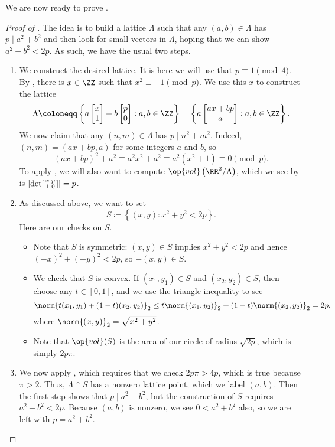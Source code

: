 \documentclass[../notes.tex]{subfiles}
\begin{document}
We are now ready to prove .
\begin{proof}[Proof of ]
	The idea is to build a lattice $\Lambda$ such that any $(a,b)\in\Lambda$ has $p\mid a^2+b^2$ and then look for small vectors in $\Lambda$, hoping that we can show $a^2+b^2<2p$. As such, we have the usual two steps.
	\begin{enumerate}
		\item We construct the desired lattice. It is here we will use that $p\equiv1\pmod4$. By , there is $x\in\ZZ$ such that $x^2\equiv-1\pmod p$. We use this $x$ to construct the lattice
		\[\Lambda\coloneqq\left\{a\begin{bmatrix}
			x \\ 1
		\end{bmatrix}+b\begin{bmatrix}
			p \\ 0
		\end{bmatrix}:a,b\in\ZZ\right\}=\left\{a\begin{bmatrix}
			ax+bp \\ a
		\end{bmatrix}:a,b\in\ZZ\right\}.\]
		We now claim that any $(n,m)\in\Lambda$ has $p\mid n^2+m^2$. Indeed, $(n,m)=(ax+bp,a)$ for some integers $a$ and $b$, so
		\[(ax+bp)^2+a^2\equiv a^2x^2+a^2\equiv a^2\left(x^2+1\right)\equiv0\pmod p.\]
		To apply , we will also want to compute $\op{vol}\left(\RR^2/\Lambda\right)$, which we see by  is $\left|\det\begin{bsmallmatrix}
			x & p \\
			1 & 0
		\end{bsmallmatrix}\right|=p$.
		\item As discussed above, we want to set
		\[S\coloneqq\left\{(x,y):x^2+y^2<2p\right\}.\]
		Here are our checks on $S$.
		\begin{itemize}
			\item Note that $S$ is symmetric: $(x,y)\in S$ implies $x^2+y^2<2p$ and hence $(-x)^2+(-y)^2<2p$, so $-(x,y)\in S$.
			\item We check that $S$ is convex. If $(x_1,y_1)\in S$ and $(x_2,y_2)\in S$, then choose any $t\in[0,1]$, and we use the triangle inequality to see
			\[\norm{t(x_1,y_1)+(1-t)(x_2,y_2)}_2\le t\norm{(x_1,y_2)}_2+(1-t)\norm{(x_2,y_2)}_2=2p,\]
			where $\norm{(x,y)}_2=\sqrt{x^2+y^2}$.
			\item Note that $\op{vol}(S)$ is the area of our circle of radius $\sqrt{2p}$, which is simply $2p\pi$.
		\end{itemize}
		\item We now apply , which requires that we check $2p\pi>4p$, which is true because $\pi>2$. Thus, $\Lambda\cap S$ has a nonzero lattice point, which we label $(a,b)$. Then the first step shows that $p\mid a^2+b^2$, but the construction of $S$ requires $a^2+b^2<2p$. Because $(a,b)$ is nonzero, we see $0<a^2+b^2$ also, so we are left with $p=a^2+b^2$.
		\qedhere
	\end{enumerate}
\end{proof}
\end{document}
